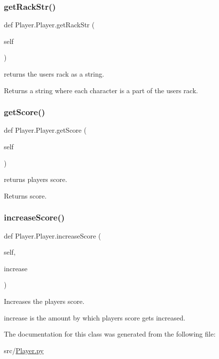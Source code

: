 \subsubsection{\texorpdfstring{get\+Rack\+Str()}{getRackStr()}}
{\footnotesize\ttfamily def Player.\+Player.\+get\+Rack\+Str (\begin{DoxyParamCaption}\item[{}]{self }\end{DoxyParamCaption})}



returns the users rack as a string. 

\begin{DoxyReturn}{Returns}
a string where each character is a part of the users rack. 
\end{DoxyReturn}
\mbox{\label{class_player_1_1_player_a3671aee22ba33c5c0c794566d0fb3804}} 
\subsubsection{\texorpdfstring{get\+Score()}{getScore()}}
{\footnotesize\ttfamily def Player.\+Player.\+get\+Score (\begin{DoxyParamCaption}\item[{}]{self }\end{DoxyParamCaption})}



returns players score. 

\begin{DoxyReturn}{Returns}
score. 
\end{DoxyReturn}
\mbox{\label{class_player_1_1_player_ac5dad5770ed6c800f0bd5953696504d2}} 
\subsubsection{\texorpdfstring{increase\+Score()}{increaseScore()}}
{\footnotesize\ttfamily def Player.\+Player.\+increase\+Score (\begin{DoxyParamCaption}\item[{}]{self,  }\item[{}]{increase }\end{DoxyParamCaption})}



Increases the players score. 

increase is the amount by which players score gets increased. 

The documentation for this class was generated from the following file\+:\begin{DoxyCompactItemize}
\item 
src/\hyperlink{_player_8py}{Player.\+py}\end{DoxyCompactItemize}
